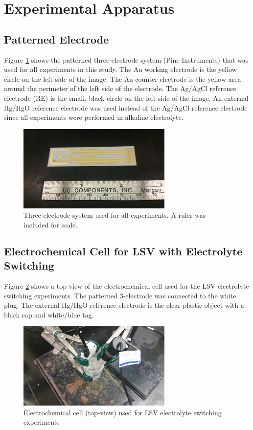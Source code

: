 \documentclass[journal=jpccck,manuscript=suppinfo,email=true]{achemso}
\begin{document}
\section{Experimental Apparatus}
\label{sec-5}
\subsection{Patterned Electrode}
\label{sec-5-1}
Figure \ref{fig-s8} shows the patterned three-electrode system (Pine Instruments) that was used for all experiments in this study. The Au working electrode is the yellow circle on the left side of the image. The Au counter electrode is the yellow area around the perimeter of the left side of the electrode. The Ag/AgCl reference electrode (RE) is the small, black circle on the left side of the image. An external Hg/HgO reference electrode was used instead of the Ag/AgCl reference electrode since all experiments were performed in alkaline electrolyte.

\begin{figure}[h]
\centering
\includegraphics[width=3in]{./images/apparatus/electrode.png}
\caption{\label{fig-s8}Three-electrode system used for all experiments. A ruler was included for scale.}
\end{figure}

\subsection{Electrochemical Cell for LSV with Electrolyte Switching}
\label{sec-5-2}
Figure \ref{fig-s9} shows a top-view of the electrochemical cell used for the LSV electrolyte switching experiments. The patterned 3-electrode was connected to the white plug. The external Hg/HgO reference electrode is the clear plastic object with a black cap and white/blue tag.

\begin{figure}[h]
\centering
\includegraphics[width=3in]{./images/apparatus/ecell-bench-1.png}
\caption{\label{fig-s9}Electrochemical cell (top-view) used for LSV electrolyte switching experiments}
\end{figure}
\end{document}
